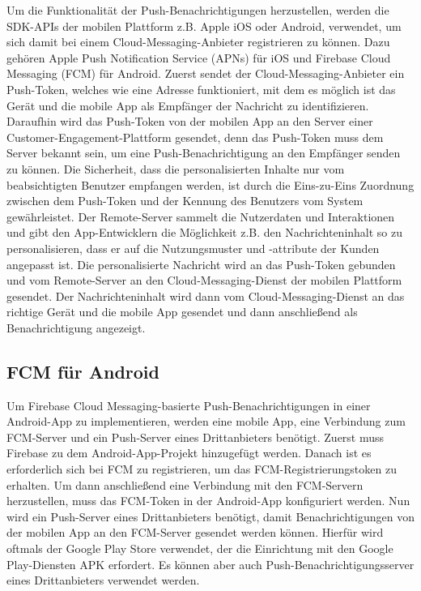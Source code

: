 \documentclass[sigconf]{acmart}
\begin{document}
Um die Funktionalität der Push-Benachrichtigungen herzustellen, 
werden die SDK-APIs der mobilen Plattform z.B. Apple iOS oder Android, 
verwendet, um sich damit bei einem Cloud-Messaging-Anbieter 
registrieren zu können. Dazu gehören Apple Push Notification Service 
(APNs) für iOS und Firebase Cloud Messaging (FCM) für Android.
Zuerst sendet der Cloud-Messaging-Anbieter ein Push-Token, welches wie 
eine Adresse funktioniert, mit dem es möglich ist das Gerät und die 
mobile App als Empfänger der Nachricht zu identifizieren.
Daraufhin wird das Push-Token von der mobilen App an den Server einer 
Customer-Engagement-Plattform gesendet, denn das Push-Token muss dem 
Server bekannt sein, um eine Push-Benachrichtigung an den Empfänger 
senden zu können.
Die Sicherheit, dass die personalisierten Inhalte nur vom 
beabsichtigten Benutzer empfangen werden, ist durch die Eins-zu-Eins 
Zuordnung zwischen dem Push-Token und der Kennung des Benutzers vom 
System gewährleistet.
Der Remote-Server sammelt die Nutzerdaten und Interaktionen und gibt 
den App-Entwicklern die Möglichkeit z.B. den Nachrichteninhalt so zu 
personalisieren, dass er auf die Nutzungsmuster und -attribute der 
Kunden angepasst ist.
Die personalisierte Nachricht wird an das Push-Token gebunden und 
vom Remote-Server an den Cloud-Messaging-Dienst der mobilen 
Plattform gesendet.
Der Nachrichteninhalt wird dann vom Cloud-Messaging-Dienst an das 
richtige Gerät und die mobile App gesendet und dann anschließend als 
Benachrichtigung angezeigt.

\subsection{FCM für Android}

Um Firebase Cloud Messaging-basierte Push-Benachrichtigungen in einer 
Android-App zu implementieren, werden eine mobile App, eine Verbindung 
zum FCM-Server und ein Push-Server eines Drittanbieters benötigt.
Zuerst muss Firebase zu dem Android-App-Projekt hinzugefügt werden. 
Danach ist es erforderlich sich bei FCM zu registrieren, um das 
FCM-Registrierungstoken zu erhalten. Um dann anschließend eine 
Verbindung mit den FCM-Servern herzustellen, muss das FCM-Token 
in der Android-App konfiguriert werden. Nun wird ein Push-Server 
eines Drittanbieters benötigt, damit Benachrichtigungen von der 
mobilen App an den FCM-Server gesendet werden können.
Hierfür wird oftmals der Google Play Store verwendet, der die 
Einrichtung mit den Google Play-Diensten APK erfordert. Es können 
aber auch Push-Benachrichtigungsserver eines Drittanbieters verwendet 
werden.
\end{document}
